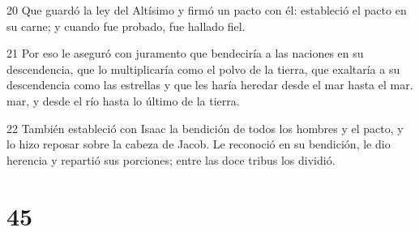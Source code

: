 \par 20 Que guardó la ley del Altísimo y firmó un pacto con él: estableció el pacto en su carne; y cuando fue probado, fue hallado fiel.
\par 21 Por eso le aseguró con juramento que bendeciría a las naciones en su descendencia, que lo multiplicaría como el polvo de la tierra, que exaltaría a su descendencia como las estrellas y que les haría heredar desde el mar hasta el mar. mar, y desde el río hasta lo último de la tierra.
\par 22 También estableció con Isaac la bendición de todos los hombres y el pacto, y lo hizo reposar sobre la cabeza de Jacob. Le reconoció en su bendición, le dio herencia y repartió sus porciones; entre las doce tribus los dividió.

\chapter{45}

